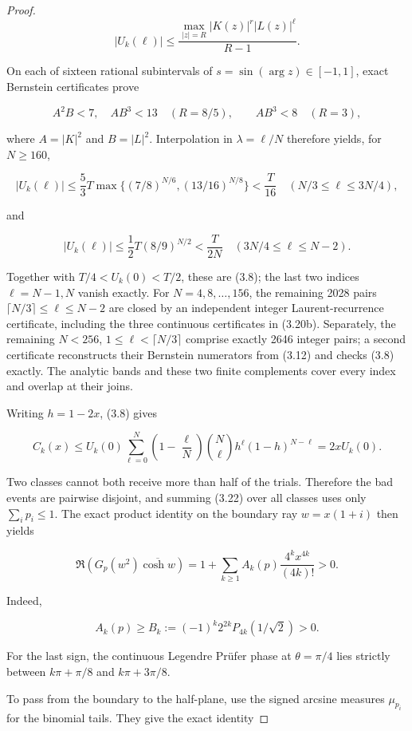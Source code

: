 \documentclass[11pt]{article}
\begin{document}
\begin{proof}
\[
 |U_k(\ell)|\le
 \frac{\max_{|z|=R}|K(z)|^r|L(z)|^\ell}{R-1}. \tag{3.20a}
\]

On each of sixteen rational subintervals of $s=\sin(\arg z)\in[-1,1]$,
exact Bernstein certificates prove

\[
 A^2B<7,\quad AB^3<13\quad(R=8/5),
 \qquad AB^3<8\quad(R=3), \tag{3.20b}
\]

where $A=|K|^2$ and $B=|L|^2$.  Interpolation in
$\lambda=\ell/N$ therefore yields, for $N\ge160$,

\[
 |U_k(\ell)|\le \frac53T
 \max\{(7/8)^{N/6},(13/16)^{N/8}\}<\frac{T}{16}
 \quad (N/3\le\ell\le3N/4),
\]

and

\[
 |U_k(\ell)|\le\frac12T(8/9)^{N/2}<\frac{T}{2N}
 \quad (3N/4\le\ell\le N-2).
\]

Together with $T/4<U_k(0)<T/2$, these are (3.8); the last two indices
$\ell=N-1,N$ vanish exactly.  For $N=4,8,\ldots,156$, the remaining
2028 pairs $\lceil N/3\rceil\le\ell\le N-2$ are closed by an independent
integer Laurent-recurrence certificate, including the three continuous
certificates in (3.20b).  Separately, the remaining
$N<256$, $1\le\ell<\lceil N/3\rceil$ comprise exactly 2646 integer
pairs; a second certificate reconstructs their Bernstein numerators from
(3.12) and checks (3.8) exactly.  The analytic bands and these two finite
complements cover every index and overlap at their joins.

Writing $h=1-2x$, (3.8) gives

\[
C_k(x)\le U_k(0)\sum_{\ell=0}^N
\left(1-\frac\ell N\right)\binom N\ell h^\ell(1-h)^{N-\ell}
=2xU_k(0). \tag{3.22}
\]

Two classes cannot both receive more than half of the trials.  Therefore the bad
events are pairwise disjoint, and summing (3.22) over all classes uses only
$\sum_i p_i\le1$.  The exact product identity on the boundary ray
$w=x(1+i)$ then yields

\[
\Re\!\left(G_p(w^2)\overline{\cosh w}\right)
=1+\sum_{k\ge1}A_k(p)\frac{4^kx^{4k}}{(4k)!}>0. \tag{3.23}
\]

Indeed,

\[
A_k(p)\ge B_k:=(-1)^k2^{2k}P_{4k}(1/\sqrt2)>0. \tag{3.24}
\]

For the last sign, the continuous Legendre Prüfer phase at
$\theta=\pi/4$ lies strictly between
$k\pi+\pi/8$ and $k\pi+3\pi/8$.

To pass from the boundary to the half-plane, use the signed arcsine measures
$\mu_{p_i}$ for the binomial tails.  They give the exact identity


\end{proof}
\end{document}
